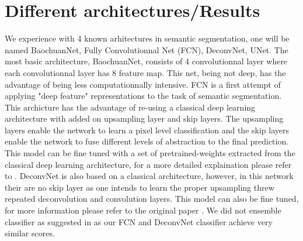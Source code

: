 \documentclass{article}
\begin{document}
\section{Different architectures/Results}
\label{sec:method}
We experience with 4 known arhitectures in semantic segmentation, one 
will be named BaochuanNet, Fully Convolutionnal Net (FCN), DeconvNet, 
UNet. The most basic architecture, BaochuanNet, consists of 4 
convolutionnal layer where each convolutionnal layer has 8 feature map. 
This net, being not deep, has the advantage of being less 
computationnally intensive. FCN is a first attempt of applying "deep 
feature" representations to the task of semantic segmentation. This 
archicture has the advantage of re-using a classical deep learning 
architecture with added on upsampling layer and skip layers. The 
upsampling layers enable the network to learn a pixel level classification 
and the skip layers enable the network to fuse different levels of 
abstraction to the final prediction. This model can be fine tuned with a 
set of pretrained-weights extracted from the classical deep learning 
architecture, for a more detailed explaination please refer to \cite{long2015fcn}. DeconvNet is also based on a classical architecture, 
however, in this network their are no skip layer as one intends to learn 
the proper upsampling threw repeated deconvolution and convolution 
layers. This model can also be fine tuned, for more information please 
refer to the original paper \cite{noh2015learning}. We did not
ensemble classifier as suggested in 
\cite{noh2015learning} as our FCN and DeconvNet classifier achieve very similar scores.
\end{document}
